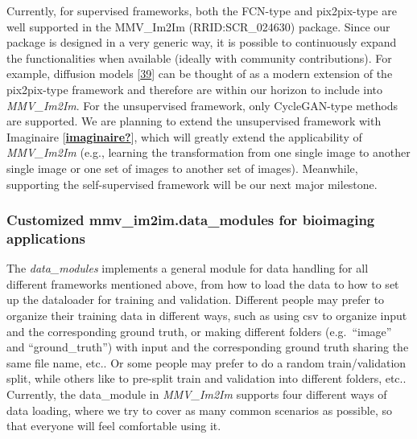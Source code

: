 Currently, for supervised frameworks, both the FCN-type and pix2pix-type are well supported in the MMV\_Im2Im (RRID:SCR\_024630) package. Since our package is designed in a very generic way, it is possible to continuously expand the functionalities when available (ideally with community contributions). For example, diffusion models {[}\protect\hyperlink{ref-1A3yurr7m}{39}{]} can be thought of as a modern extension of the pix2pix-type framework and therefore are within our horizon to include into \emph{MMV\_Im2Im}. For the unsupervised framework, only CycleGAN-type methods are supported. We are planning to extend the unsupervised framework with Imaginaire {[}\protect\hyperlink{ref-imaginaire}{\textbf{imaginaire?}}{]}, which will greatly extend the applicability of \emph{MMV\_Im2Im} (e.g., learning the transformation from one single image to another single image or one set of images to another set of images). Meanwhile, supporting the self-supervised framework will be our next major milestone.

\hypertarget{customized-mmv_im2im.data_modules-for-bioimaging-applications}{%
\subsubsection{Customized mmv\_im2im.data\_modules for bioimaging applications}\label{customized-mmv_im2im.data_modules-for-bioimaging-applications}}

The \emph{data\_modules} implements a general module for data handling for all different frameworks mentioned above, from how to load the data to how to set up the dataloader for training and validation. Different people may prefer to organize their training data in different ways, such as using csv to organize input and the corresponding ground truth, or making different folders (e.g.~``image'' and ``ground\_truth'') with input and the corresponding ground truth sharing the same file name, etc.. Or some people may prefer to do a random train/validation split, while others like to pre-split train and validation into different folders, etc.. Currently, the data\_module in \emph{MMV\_Im2Im} supports four different ways of data loading, where we try to cover as many common scenarios as possible, so that everyone will feel comfortable using it.

